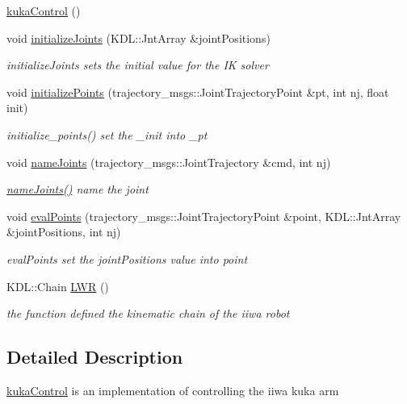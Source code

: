 \begin{DoxyCompactItemize}
\item 
\hyperlink{classkukaControl_ac6e3f58be7145947e07ac5f3873c5446}{kuka\+Control} ()
\item 
void \hyperlink{classkukaControl_ab0ea69470800ff8c90c81342fa868bfd}{initialize\+Joints} (K\+D\+L\+::\+Jnt\+Array \&joint\+Positions)
\begin{DoxyCompactList}\small\item\em initialize\+Joints sets the initial value for the IK solver \end{DoxyCompactList}\item 
void \hyperlink{classkukaControl_a4b47190f308bc2fa9cc197f47baf6a36}{initialize\+Points} (trajectory\+\_\+msgs\+::\+Joint\+Trajectory\+Point \&pt, int nj, float init)
\begin{DoxyCompactList}\small\item\em initialize\+\_\+points() set the \+\_\+init into \+\_\+pt \end{DoxyCompactList}\item 
void \hyperlink{classkukaControl_a7ced7a3bc02b208e01c129af97009b13}{name\+Joints} (trajectory\+\_\+msgs\+::\+Joint\+Trajectory \&cmd, int nj)
\begin{DoxyCompactList}\small\item\em \hyperlink{classkukaControl_a7ced7a3bc02b208e01c129af97009b13}{name\+Joints()} name the joint \end{DoxyCompactList}\item 
void \hyperlink{classkukaControl_a6cbf9b3546c9f4e866843c3fed3af16b}{eval\+Points} (trajectory\+\_\+msgs\+::\+Joint\+Trajectory\+Point \&point, K\+D\+L\+::\+Jnt\+Array \&joint\+Positions, int nj)
\begin{DoxyCompactList}\small\item\em eval\+Points set the joint\+Positions value into point \end{DoxyCompactList}\item 
K\+D\+L\+::\+Chain \hyperlink{classkukaControl_ae1a0a52dba5433d2e5c496e137a34184}{L\+WR} ()
\begin{DoxyCompactList}\small\item\em the function defined the kinematic chain of the iiwa robot \end{DoxyCompactList}\end{DoxyCompactItemize}


\subsection{Detailed Description}
\hyperlink{classkukaControl}{kuka\+Control} is an implementation of controlling the iiwa kuka arm
\begin{DoxyItemize}
\item 
\end{DoxyItemize}

